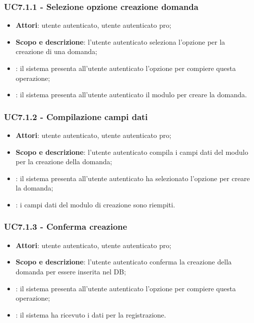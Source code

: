 	\subsubsection{UC7.1.1 - Selezione opzione creazione domanda}
	\begin{itemize}
		\item
			\textbf{Attori}: utente autenticato, utente autenticato pro;
		\item
			\textbf{Scopo e descrizione}: l'utente autenticato seleziona l'opzione per la creazione di una domanda;
		\item		
			: il sistema presenta all'utente autenticato l'opzione per compiere questa operazione;
		\item
			: il sistema presenta all'utente autenticato il modulo per creare la domanda.
	\end{itemize}	
	\subsubsection{UC7.1.2 - Compilazione campi dati}
	\begin{itemize}
		\item
			\textbf{Attori}: utente autenticato, utente autenticato pro;
		\item
			\textbf{Scopo e descrizione}: l'utente autenticato compila i campi dati del modulo per la creazione della domanda;
		\item		
			: il sistema presenta all'utente autenticato ha selezionato l'opzione per creare la domanda;
		\item
			: i campi dati del modulo di creazione sono riempiti.
	\end{itemize}	
	\subsubsection{UC7.1.3 - Conferma creazione}
	\begin{itemize}
		\item
			\textbf{Attori}: utente autenticato, utente autenticato pro;
		\item
			\textbf{Scopo e descrizione}: l'utente autenticato conferma la creazione della domanda per essere inserita nel DB;
		\item		
			: il sistema presenta all'utente autenticato l'opzione per compiere questa operazione;
		\item
			: il sistema ha ricevuto i dati per la registrazione.
	\end{itemize}	
